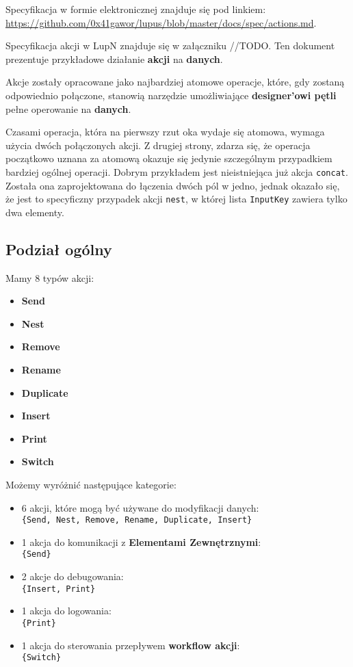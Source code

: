 \label{appendix:6}

Specyfikacja w formie elektronicznej znajduje się pod linkiem: \url{https://github.com/0x41gawor/lupus/blob/master/docs/spec/actions.md}.

Specyfikacja akcji w LupN znajduje się w załączniku //TODO. Ten dokument prezentuje przykładowe działanie \textbf{akcji} na \textbf{danych}.

Akcje zostały opracowane jako najbardziej atomowe operacje, które, gdy zostaną odpowiednio połączone, stanowią narzędzie umożliwiające \textbf{designer'owi pętli} pełne operowanie na \textbf{danych}.

Czasami operacja, która na pierwszy rzut oka wydaje się atomowa, wymaga użycia dwóch połączonych akcji. Z drugiej strony, zdarza się, że operacja początkowo uznana za atomową okazuje się jedynie szczególnym przypadkiem bardziej ogólnej operacji. Dobrym przykładem jest nieistniejąca już akcja \texttt{concat}. Została ona zaprojektowana do łączenia dwóch pól w jedno, jednak okazało się, że jest to specyficzny przypadek akcji \texttt{nest}, w której lista \texttt{InputKey} zawiera tylko dwa elementy.

\subsection{Podział ogólny}

Mamy 8 typów akcji:

\begin{itemize}
    \item \textbf{Send}
    \item \textbf{Nest}
    \item \textbf{Remove}
    \item \textbf{Rename}
    \item \textbf{Duplicate}
    \item \textbf{Insert}
    \item \textbf{Print}
    \item \textbf{Switch}
\end{itemize}

Możemy wyróżnić następujące kategorie:

\begin{itemize}
    \item 6 akcji, które mogą być używane do modyfikacji danych: \\ 
          \texttt{\{Send, Nest, Remove, Rename, Duplicate, Insert\}}
    \item 1 akcja do komunikacji z \textbf{Elementami Zewnętrznymi}: \\ 
          \texttt{\{Send\}}
    \item 2 akcje do debugowania: \\ 
          \texttt{\{Insert, Print\}}
    \item 1 akcja do logowania: \\ 
          \texttt{\{Print\}}
    \item 1 akcja do sterowania przepływem \textbf{workflow akcji}: \\ 
          \texttt{\{Switch\}}
\end{itemize}

